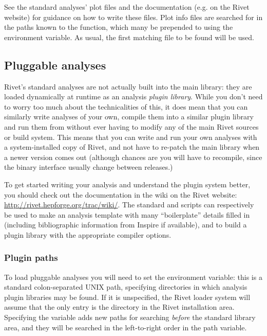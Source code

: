 See the standard analyses' plot files and the  documentation
(e.g. on the Rivet website) for guidance on how to write these files. Plot info
files are searched for in the paths known to the
 function, which many be prepended to using
the  environment variable. As usual, the first matching
file to be found will be used.



\subsection{Pluggable analyses}

Rivet's standard analyses are not actually built into the main 
library: they are loaded dynamically at runtime as an analysis \emph{plugin
  library}. While you don't need to worry too much about the technicalities of
this, it does mean that you can similarly write analyses of your own, compile
them into a similar plugin library and run them from  without ever
having to modify any of the main Rivet sources or build system. This means that
you can write and run your own analyses with a system-installed copy of Rivet,
and not have to re-patch the main library when a newer version comes out
(although chances are you will have to recompile, since the binary interface usually
change between releases.)

To get started writing your analysis and understand the plugin system better,
you should check out the documentation in the wiki on the Rivet website:
\url{http://rivet.hepforge.org/trac/wiki/}. The standard
 and  scripts can respectively be
used to make an analysis template with many ``boilerplate'' details filled in
(including bibliographic information from Inspire if available), and to build a
plugin library with the appropriate compiler options.


\subsubsection{Plugin paths}

To load pluggable analyses you will need to set the 
environment variable: this is a standard colon-separated UNIX path, specifying
directories in which analysis plugin libraries may be found. If it is
unspecified, the Rivet loader system will assume that the only entry is the
 directory in the Rivet installation area. Specifying the variable adds
new paths for searching \emph{before} the standard library area, and they will
be searched in the left-to-right order in the path variable.

